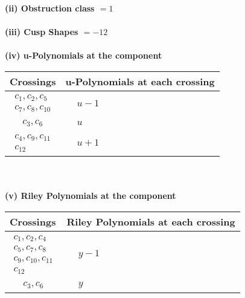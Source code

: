 \documentclass[1p]{elsarticle_modified}
\theoremstyle{definition}
\begin{document}
\flushleft \textbf{(ii) Obstruction class $= 1$}\\~\\
\flushleft \textbf{(iii) Cusp Shapes $= -12$}\\~\\
\newpage\renewcommand{\arraystretch}{1}
\flushleft \textbf{(iv) u-Polynomials at the component}\newline \\
\begin{tabular}{m{50pt}|m{274pt}}
Crossings & \hspace{64pt}u-Polynomials at each crossing \\
\hline $$\begin{aligned}c_{1},c_{2},c_{5}\\c_{7},c_{8},c_{10}\end{aligned}$$&$\begin{aligned}
&u-1
\end{aligned}$\\
\hline $$\begin{aligned}c_{3},c_{6}\end{aligned}$$&$\begin{aligned}
&u
\end{aligned}$\\
\hline $$\begin{aligned}c_{4},c_{9},c_{11}\\c_{12}\end{aligned}$$&$\begin{aligned}
&u+1
\end{aligned}$\\
\hline
\end{tabular}\\~\\
\newpage\renewcommand{\arraystretch}{1}
\flushleft \textbf{(v) Riley Polynomials at the component}\newline \\
\begin{tabular}{m{50pt}|m{274pt}}
Crossings & \hspace{64pt}Riley Polynomials at each crossing \\
\hline $$\begin{aligned}c_{1},c_{2},c_{4}\\c_{5},c_{7},c_{8}\\c_{9},c_{10},c_{11}\\c_{12}\end{aligned}$$&$\begin{aligned}
&y-1
\end{aligned}$\\
\hline $$\begin{aligned}c_{3},c_{6}\end{aligned}$$&$\begin{aligned}
&y
\end{aligned}$\\
\hline
\end{tabular}\\~\\
\end{document}
